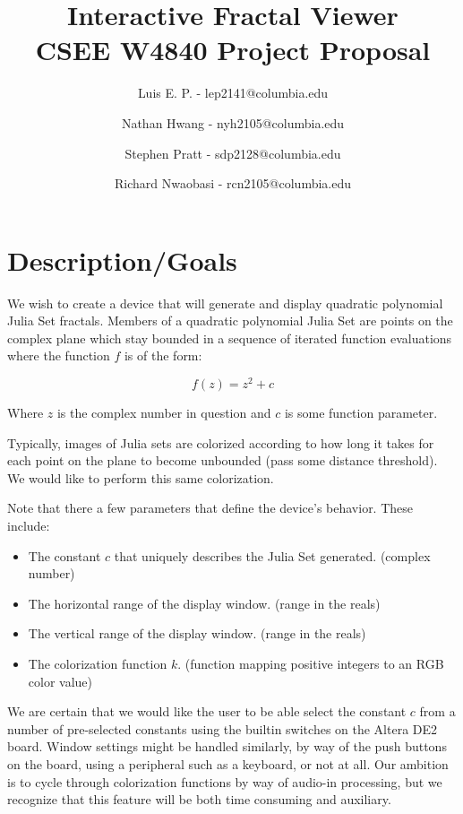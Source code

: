 \documentclass{article}
\begin{document}
\title{Interactive Fractal Viewer \\
CSEE W4840 Project Proposal}
\author{Luis E. P. - lep2141@columbia.edu \and
Nathan Hwang - nyh2105@columbia.edu \and
Stephen Pratt - sdp2128@columbia.edu \and
Richard Nwaobasi - rcn2105@columbia.edu}
\maketitle

\section{Description/Goals}

We wish to create a device that will generate and display quadratic
polynomial Julia Set fractals. Members of a quadratic polynomial Julia
Set are points on the complex plane which stay bounded in a sequence
of iterated function evaluations where the function $f$ is of the form:

\begin{equation}
f(z) = z^2 + c
\end{equation}

Where $z$ is the complex number in question and $c$ is some function parameter.

Typically, images of Julia sets are colorized according to how long it
takes for each point on the plane to become unbounded (pass some
distance threshold). We would like to perform this same colorization.

Note that there a few parameters that define the device’s
behavior. These include:

\begin{itemize}
\item The constant $c$ that uniquely describes the Julia Set
  generated. (complex number)
\item The horizontal range of the display window. (range in the reals)
\item The vertical range of the display window. (range in the reals)
\item The colorization function $k$. (function mapping positive integers
  to an RGB color value)
\end{itemize}

We are certain that we would like the user to be able select the
constant $c$ from a number of pre-selected constants using the builtin
switches on the Altera DE2 board. Window settings might be handled
similarly, by way of the push buttons on the board, using a peripheral
such as a keyboard, or not at all. Our ambition is to cycle through
colorization functions by way of audio-in processing, but we
recognize that this feature will be both time consuming and auxiliary.
\end{document}
